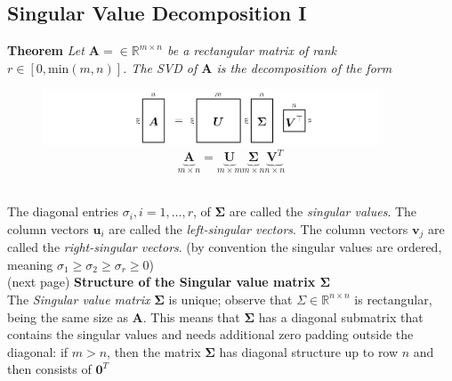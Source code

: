 \documentclass{report}
\begin{document}
\subsection{Singular Value Decomposition I}%
\textbf{Theorem} \textit{Let $\bm{A}=\in\mathbb{R}^{m\times n}$ be a rectangular matrix of rank 
$r\in[0,\text{min}(m,n)]$. The SVD of $\bm{A}$ is the decomposition of the form}
\begin{figure}[h]
\includegraphics[width=10cm]{21}\\
\centering
\begin{equation*}
\underbrace{\bm{A}}_{m\times n}=\underbrace{\bm{U}}_{m\times m}
\underbrace{\bm{\Sigma}}_{m\times n}\underbrace{\bm{V}^T}_{n\times n}
\end{equation*}
\end{figure}\\
The diagonal entries $\sigma_{i},i=1,\ldots,r$, of $\bm{\Sigma}$ are called the \textit{singular values}. 
The column vectors $\bm{u}_i$ are called the \textit{left-singular vectors}. 
The column vectors $\bm{v}_j$ are called the \textit{right-singular vectors}. (by convention the singular values are
ordered, meaning $\sigma_1\geq\sigma_2\geq\sigma_r\geq0$)
\\(next page)
\newpage
\noindent\textbf{Structure of the Singular value matrix $\bm{\Sigma}$}\\
The \textit{Singular value matrix} $\bm{\Sigma}$ is unique; observe that $\Sigma\in\mathbb{R}^{n\times n}$ is
rectangular, being the same size as $\bm{A}$. This means that $\bm{\Sigma}$ has a diagonal submatrix that contains
the singular values and needs additional zero padding outside the diagonal: if
$m>n$, then the matrix $\bm{\Sigma}$ has diagonal structure up to row $n$ and then consists of $\bm{0}^T$
\end{document}
